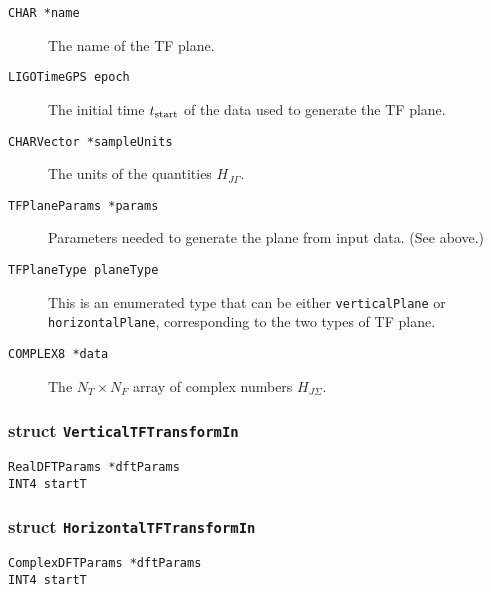 \begin{description}
\item[\texttt{CHAR  *name}] The name of the TF plane.

\item[\texttt{LIGOTimeGPS   epoch}] The initial time $t_{\rm start}$ of the
data used to generate the TF plane.

\item[\texttt{CHARVector  *sampleUnits}] The units of the quantities $H_{J\Gamma}$.

\item[\texttt{TFPlaneParams   *params}]  Parameters needed to generate the
plane from input data.  (See above.)

\item[\texttt{TFPlaneType   planeType}]  This is an enumerated type that can
be either \verb+verticalPlane+ or \verb+horizontalPlane+, corresponding to the
two types of TF plane.

\item[\texttt{COMPLEX8   *data}]  The $N_T \times N_F$ array of complex
numbers $H_{J\Sigma}$.

\end{description}

\subsubsection*{struct \texttt{VerticalTFTransformIn}}

\noindent

\begin{description}
\item[\texttt{RealDFTParams  *dftParams}]
\item[\texttt{INT4  startT}]
\end{description}

\subsubsection*{struct \texttt{HorizontalTFTransformIn}}

\noindent

\begin{description}
\item[\texttt{ComplexDFTParams  *dftParams}]
\item[\texttt{INT4  startT}]
\end{description}

